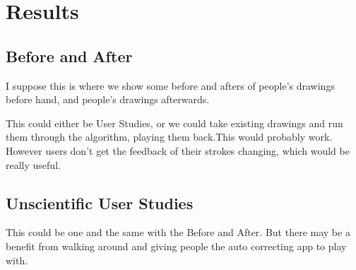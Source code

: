 \section{Results}
\subsection{Before and After}
I suppose this is where we show some before and afters of people's drawings before hand, and people's drawings afterwards.

This could either be User Studies, or we could take existing drawings and run them through the algorithm, playing them back.This would probably work. However users don't get the feedback of their strokes changing, which would be really useful.

\subsection{Unscientific User Studies}
This could be one and the same with the Before and After. But there may be a benefit from walking around and giving people the auto correcting app to play with. 

